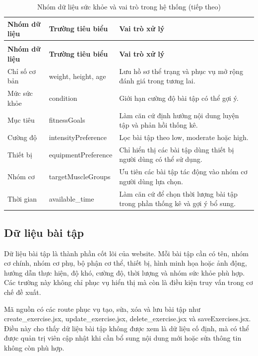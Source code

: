 \begingroup
\setlength{\tabcolsep}{3pt}
\renewcommand{\arraystretch}{1.25}
\begin{longtable}{|P{0.220\textwidth}|P{0.330\textwidth}|P{0.370\textwidth}|}
\caption{Nhóm dữ liệu sức khỏe và vai trò trong hệ thống}\\
\hline
\textbf{Nhóm dữ liệu} & \textbf{Trường tiêu biểu} & \textbf{Vai trò xử lý} \\
\hline
\endfirsthead
\caption[]{Nhóm dữ liệu sức khỏe và vai trò trong hệ thống (tiếp theo)}\\
\hline
\textbf{Nhóm dữ liệu} & \textbf{Trường tiêu biểu} & \textbf{Vai trò xử lý} \\
\hline
\endhead
Chỉ số cơ bản & weight, height, age & Lưu hồ sơ thể trạng và phục vụ mở rộng đánh giá trong tương lai. \\
\hline
Mức sức khỏe & condition & Giới hạn cường độ bài tập có thể gợi ý. \\
\hline
Mục tiêu & fitnessGoals & Làm căn cứ định hướng nội dung luyện tập và phản hồi thống kê. \\
\hline
Cường độ & intensityPreference & Lọc bài tập theo low, moderate hoặc high. \\
\hline
Thiết bị & equipmentPreference & Chỉ hiển thị các bài tập dùng thiết bị người dùng có thể sử dụng. \\
\hline
Nhóm cơ & targetMuscleGroups & Ưu tiên các bài tập tác động vào nhóm cơ người dùng lựa chọn. \\
\hline
Thời gian & available\_time & Làm căn cứ để chọn thời lượng bài tập trong phần thống kê và gợi ý bổ sung. \\
\hline
\end{longtable}
\endgroup

\subsection{Dữ liệu bài tập}

Dữ liệu bài tập là thành phần cốt lõi của website. Mỗi bài tập cần có tên, nhóm cơ chính, nhóm cơ phụ, bộ phận cơ thể, thiết bị, hình minh họa hoặc ảnh động, hướng dẫn thực hiện, độ khó, cường độ, thời lượng và nhóm sức khỏe phù hợp. Các trường này không chỉ phục vụ hiển thị mà còn là điều kiện truy vấn trong cơ chế đề xuất.


Mã nguồn có các route phục vụ tạo, sửa, xóa và lưu bài tập như create\_exercise.jsx, update\_exercise.jsx, delete\_exercise.jsx và saveExercises.jsx. Điều này cho thấy dữ liệu bài tập không được xem là dữ liệu cố định, mà có thể được quản trị viên cập nhật khi cần bổ sung nội dung mới hoặc sửa thông tin không còn phù hợp.


